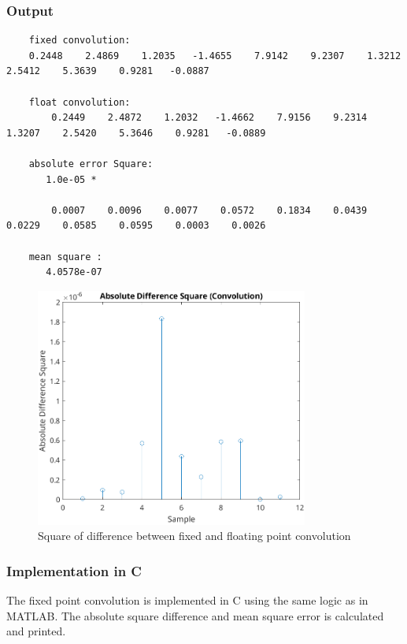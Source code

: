 \documentclass[a4paper,12pt]{article}
\begin{document}
\subsubsection{Output}
\begin{lstlisting}
    fixed convolution:
    0.2448    2.4869    1.2035   -1.4655    7.9142    9.2307    1.3212    2.5412    5.3639    0.9281   -0.0887

    float convolution:
        0.2449    2.4872    1.2032   -1.4662    7.9156    9.2314    1.3207    2.5420    5.3646    0.9281   -0.0889

    absolute error Square:
       1.0e-05 *

        0.0007    0.0096    0.0077    0.0572    0.1834    0.0439    0.0229    0.0585    0.0595    0.0003    0.0026

    mean square : 
       4.0578e-07
\end{lstlisting}

\begin{figure}[h]
    \centering
    \includegraphics[width=0.8\textwidth]{./figs/conv.png}
    \caption{Square of difference between fixed and floating point convolution}
    \label{fig:convolution}
\end{figure}

\newpage


\subsubsection{Implementation in C}
The fixed point convolution is implemented in C using the same logic as in MATLAB. 
The absolute square difference and mean square error is calculated and printed.
\end{document}
